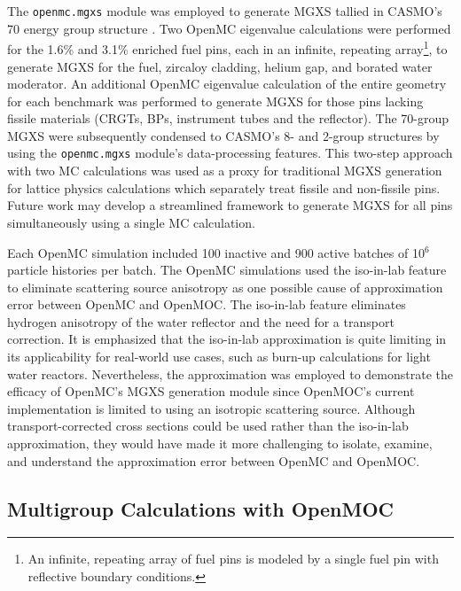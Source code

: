 The \texttt{openmc.mgxs} module was employed to generate MGXS tallied in CASMO's 70 energy group structure \cite{rhodes2006casmo}. Two OpenMC eigenvalue calculations were performed for the 1.6\% and 3.1\% enriched fuel pins, each in an infinite, repeating array\footnote{An infinite, repeating array of fuel pins is modeled by a single fuel pin with reflective boundary conditions.}, to generate MGXS for the fuel, zircaloy cladding, helium gap, and borated water moderator. An additional OpenMC eigenvalue calculation of the entire geometry for each benchmark was performed to generate MGXS for those pins lacking fissile materials (CRGTs, BPs, instrument tubes and the reflector). The 70-group MGXS were subsequently condensed to CASMO's 8- and 2-group structures by using the \texttt{openmc.mgxs} module's data-processing features. This two-step approach with two MC calculations was used as a proxy for traditional MGXS generation for lattice physics calculations which separately treat fissile and non-fissile pins. Future work may develop a streamlined framework to generate MGXS for all pins simultaneously using a single MC calculation.

Each OpenMC simulation included 100 inactive and 900 active batches of 10$^{6}$ particle histories per batch. The OpenMC simulations used the iso-in-lab feature to eliminate scattering source anisotropy as one possible cause of approximation error between OpenMC and OpenMOC. The iso-in-lab feature eliminates hydrogen anisotropy of the water reflector and the need for a transport correction. It is emphasized that the iso-in-lab approximation is quite limiting in its applicability for real-world use cases, such as burn-up calculations for light water reactors. Nevertheless, the approximation was employed to demonstrate the efficacy of OpenMC's MGXS generation module since OpenMOC's current implementation is limited to using an isotropic scattering source. Although transport-corrected cross sections could be used rather than the iso-in-lab approximation, they would have made it more challenging to isolate, examine, and understand the approximation error between OpenMC and OpenMOC.

\subsection{Multigroup Calculations with OpenMOC}
\label{subsec:openmoc}

